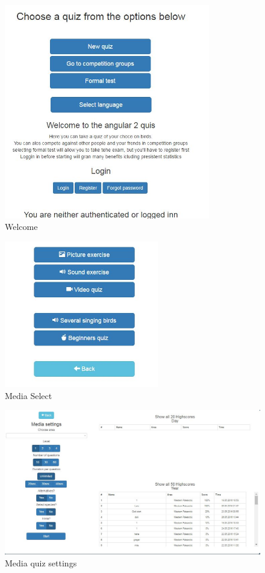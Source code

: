 \begin{figure}[h]
  \centering
  \includegraphics[width=0.8\textwidth]{figures/Welcome.jpg}
  \caption[Welcome]{Welcome}
  \label{fig:Welcome}
\end{figure}

\begin{figure}[h]
  \centering
  \includegraphics[width=0.6\textwidth]{figures/MediaSelect.JPG}
  \caption[MediaSelect]{Media Select}
  \label{fig:MediaSelect}
\end{figure}
\begin{figure}[h]
  \centering
  \includegraphics[width=1.0\textwidth]{figures/MediaSettings.JPG}
  \caption[MediaQuizSettings]{Media quiz settings}
  \label{fig:MediaQuizSettings}
\end{figure}

